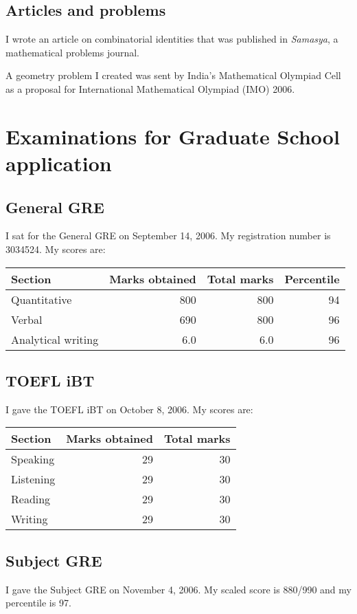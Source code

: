 \documentclass[12pt,a4paper,oneside]{amsart}
\begin{document}
\subsection{Articles and problems}

I wrote an article on combinatorial identities that was published in 
{\em Samasya}, a mathematical problems journal.

A geometry problem I created was sent by India's Mathematical Olympiad
Cell as a proposal for International Mathematical Olympiad (IMO) 2006.

\section{Examinations for Graduate School application}

\subsection{General GRE}

I sat for the General GRE on September 14, 2006. My registration
number is 3034524. My scores are:

\begin{tabular}{|l|r|r|r|}
  \hline
  Section & Marks obtained & Total marks & Percentile \\
  \hline
  Quantitative & 800 & 800 & 94\\
  Verbal & 690 & 800 & 96\\
  Analytical writing & 6.0 & 6.0 & 96\\
  \hline
\end{tabular}

\subsection{TOEFL iBT}

I gave the TOEFL iBT on October 8, 2006. My scores are:

\begin{tabular}{|l|r|r|}
  \hline
  Section & Marks obtained & Total marks \\
  \hline
  Speaking & 29 & 30\\
  Listening & 29 & 30\\
  Reading & 29 & 30\\
  Writing & 29 & 30\\
  \hline
\end{tabular}

\enlargethispage{5mm}
\subsection{Subject GRE}

I gave the Subject GRE on November 4, 2006. My scaled score is 880/990
and my percentile is 97.
\end{document}
